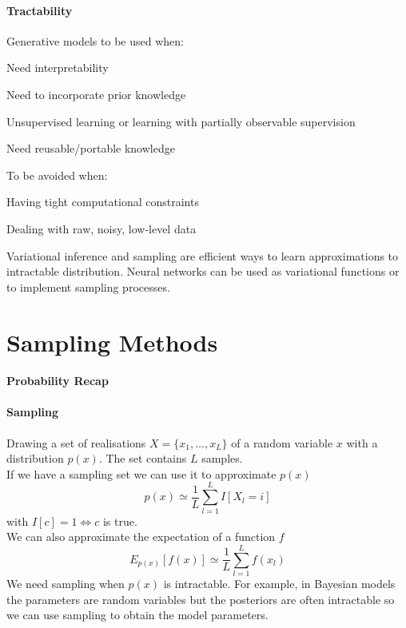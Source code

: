 \documentclass[10pt]{report}
\begin{document}
\paragraph{Tractability} Generative models to be used when:
\begin{list}{}{}
	\item Need interpretability
	\item Need to incorporate prior knowledge
	\item Unsupervised learning or learning with partially observable supervision
	\item Need reusable/portable knowledge
\end{list}
To be avoided when:
\begin{list}{}{}
	\item Having tight computational constraints
	\item Dealing with raw, noisy, low-level data
\end{list}
Variational inference and sampling are efficient ways to learn approximations to intractable distribution. Neural networks can be used as variational functions or to implement sampling processes.
\section{Sampling Methods} 
\paragraph{Probability Recap}
\paragraph{Sampling} Drawing a set of realisations $X = \{x_1,\ldots,x_L\}$ of a random variable $x$ with a distribution $p(x)$. The set contains $L$ samples.\\
If we have a sampling set we can use it to approximate $p(x)$ $$p(x)\simeq \frac{1}{L}\sum_{l=1}^L I[X_l = i]$$ with $I[c] = 1 \Leftrightarrow c$ is true.\\
We can also approximate the expectation of a function $f$ $$E_{p(x)}[f(x)]\simeq \frac{1}{L}\sum_{l=1}^L f(x_l)$$
We need sampling when $p(x)$ is intractable. For example, in Bayesian models the parameters are random variables but the posteriors are often intractable so we can use sampling to obtain the model parameters.
\end{document}
